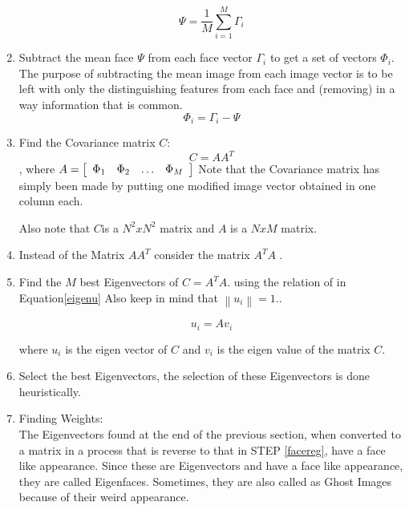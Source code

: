 \documentclass[a4paper,twoside]{article}
\begin{document}
\begin{enumerate}
\begin{equation}
\Psi  = \frac{1}{M}\sum\limits_{i = 1}^M {\Gamma _i }
\end{equation}
\item  Subtract the mean face $\Psi$ from each face vector $\Gamma_i$ to get a set of vectors $\Phi_i$. The purpose of subtracting the mean image from each image vector is to be left with only the distinguishing features from each face and (removing)  in a way information that is common.
\begin{equation}
\Phi _i  = \Gamma_i  - \Psi
\end{equation}
\item  Find the Covariance matrix $C$:
\begin{equation}
C = AA^T
\end{equation} , where $A = \left[ {\begin{array}{*{20}c}
   {\Phi _1 } & {\Phi_2} & {\dots} & {\Phi _M }  \\
\end{array}} \right]
$
Note that the Covariance matrix has simply been made by putting one modified image vector obtained in  one column each.

Also note that $C$is a $N^2xN^2$ matrix and $A$ is a $NxM$ matrix.


\item  Instead of the Matrix $AA^T$  consider the matrix $A^TA$ .


\item Find the $M$ best  Eigenvectors of $C=A^TA$. using the relation of in Equation\ref{eigenu} Also keep in mind that $\left\| {u_i} \right\| = 1.$.

\begin{equation}
 \label{eigenu}
u_i=Av_i
\end{equation}

 where  $u_i$ is the eigen vector of $C$ and $v_i$ is the eigen value of the matrix $C$. 

\item Select the best  Eigenvectors, the selection of these Eigenvectors is done heuristically.

\item Finding Weights:\\

The Eigenvectors found at the end of the previous section,  when converted to a matrix in a process that is reverse to that in STEP \ref{facereg}, have a face like appearance. Since these are Eigenvectors and have a face like appearance, they are called Eigenfaces. Sometimes, they are also called as Ghost Images because of their weird appearance.


\end{enumerate}
\end{document}
